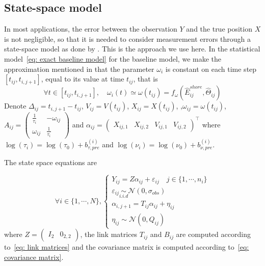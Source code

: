 \documentclass[11pt]{article}
\newcommand {\1}{\mathbb{1}}
\theoremstyle{definition}
\theoremstyle{remark}
\theoremstyle{remark}
\begin{document}
\subsection{State-space model}
\label{section: state space model}
In most applications, the error between the observation $Y$ and the true position $X$ is not negligible, so that it is needed to consider measurement errors through a state-space model as done by \cite{johnson_continuoustime_2008}. This is the approach we use here. In the statistical model~\ref{eq: exact baseline model} for the baseline model, we make the approximation mentioned in \cite{michelot_varying-coefficient_2021} that the parameter $\omega_i$ is constant on each time step $[t_{ij},t_{i,j+1}]$, equal to its value at time $t_{ij}$, that is 
\[\forall t \in [t_{ij},t_{i,j+1}], \quad \omega_{i}(t) \simeq \omega(t_{ij})= f_{\omega}(\hat{E}^{shore}_{ij},\hat{\Theta}_{ij})\]
 Denote $\Delta_{ij}=t_{i,j+1}-t_{ij}$, $V_{ij}=V(t_{ij})$, $X_{ij}=X(t_{ij})$, ,$\omega_{ij}=\omega(t_{ij})$, $A_{ij}=\begin{pmatrix} 
	\frac{1}{\tau_{i}} & -\omega_{ij} \\
	\omega_{ij} & \frac{1}{\tau_{i}}
\end{pmatrix}$ and $\alpha_{ij}=\begin{pmatrix} X_{ij,1}  & X_{ij,2} & V_{ij,1} & V_{ij,2}\end{pmatrix}^\top$ where $\log(\tau_i)=\log(\tau_0)+b_{\tau,pre}^{(i)}$ and $\log(\nu_i)=\log(\nu_0)+b_{\nu,pre}^{(i)}$.

The state space equations are

\begin{equation}
	\forall i \in \{1,\cdots,N\}, \left\{
	\begin{array}{l}
		Y_{ij}=Z\alpha_{ij}+\varepsilon_{ij} \quad j \in \{1,\cdots,n_i\}\\
		\varepsilon_{ij} \underset{i.i.d}{\sim} \mathcal{N}(0,\sigma_{obs}) \\
		\alpha_{i,j+1}=T_{ij} \alpha_{ij} + \eta_{ij} \\
		\eta_{ij} \sim \mathcal{N}(0,Q_{ij})
	\end{array}
	\right.
	\label{eq: RACVM state space}
\end{equation}
where $Z=\begin{pmatrix} I_2 & 0_{2,2}\end{pmatrix}$, the link matrices $T_{ij}$ and $B_{ij}$ are computed according to~\ref{eq: link matrices} and the covariance matrix is computed according to~\ref{eq: covariance matrix}.
\\
\end{document}
